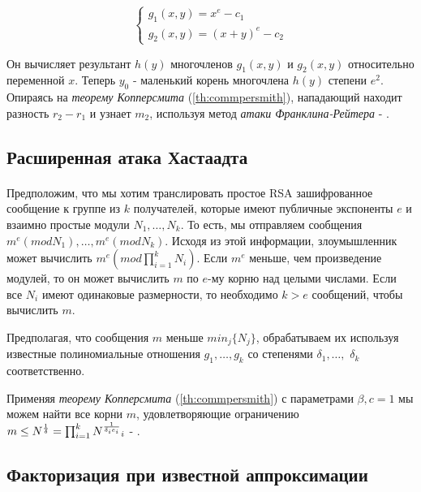     \begin{equation}
	  \begin{cases}
	    g_1(x,y) = x^e - c_1 \\
	    g_2(x,y) = (x+y)^e - c_2
	  \end{cases}    
      \end{equation}
      
  Он вычисляет результант $h(y)$ многочленов $g_1(x,y)$ и $g_2(x,y)$ относительно переменной $x$. Теперь $y_0$ -
  маленький корень многочлена $h(y)$ степени $e^2$. Опираясь на \textit{теорему Копперсмита} (\ref{th:commpersmith}), нападающий находит разность $r_2 - r_1$ и 
  узнает $m_2$, используя метод \textit{атаки Франклина-Рейтера} - \cite[страницы 331-332]{may10}.

\subsection{Расширенная атака Хастаадта}

\paragraph{} Предположим, что мы хотим транслировать простое RSA зашифрованное сообщение к группе из {$k$} получателей, которые имеют публичные
  экспоненты {$e$} и взаимно простые модули {$N_1, \dots, N_k$}. То есть, мы отправляем сообщения {$m^e (mod N_1), \dots, m^e (mod N_k)$}. 
  Исходя из этой информации, злоумышленник может вычислить {$m^e (mod \prod_{i=1}^{k}{N_i})$}. Если {$m^e$} меньше, чем произведение модулей, то он 
  может вычислить {$m$} по {$e$}-му корню над целыми числами. Если все {$N_i$} имеют одинаковые размерности, то необходимо {$k > e$} сообщений,
  чтобы вычислить {$m$}.
  
  Предполагая, что сообщения {$m$} меньше {$min_j \{ N_j \}$}, обрабатываем их используя известные полиномиальные отношения {$g_1, \dots, g_k$}
  со степенями $\delta_1, \dots,$ $\delta_k$ соответственно.
  
  Применяя \textit{теорему Копперсмита} (\ref{th:commpersmith}) с параметрами {$\beta,c=1$} мы можем найти все корни {$m$}, удовлетворяющие ограничению
  {$m \le N^\frac{1}{\delta} = \prod_{i=1}^{k}{N\textsuperscript{{$\frac{1}{\delta_i e_i}$}}_i}$} - \cite[страницы 331-333]{may10}.

\subsection{Факторизация при известной аппроксимации}

